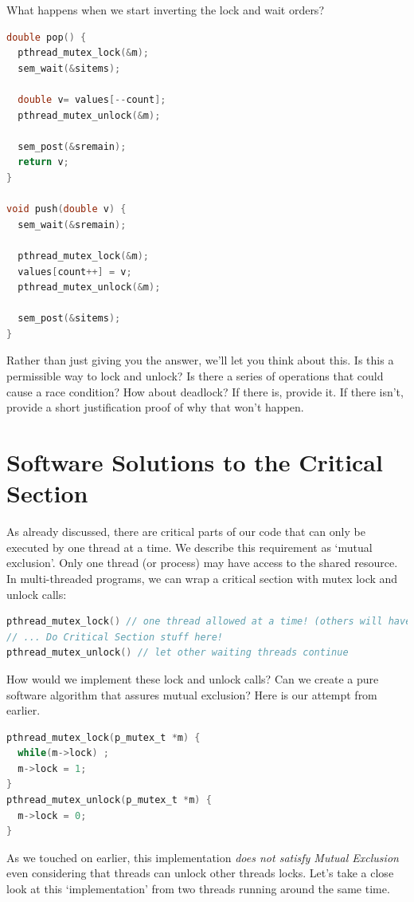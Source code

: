 What happens when we start inverting the lock and wait orders?

\begin{lstlisting}[language=C]
double pop() {
  pthread_mutex_lock(&m);
  sem_wait(&sitems);

  double v= values[--count];
  pthread_mutex_unlock(&m);

  sem_post(&sremain);
  return v;
}

void push(double v) {
  sem_wait(&sremain);

  pthread_mutex_lock(&m);
  values[count++] = v;
  pthread_mutex_unlock(&m);

  sem_post(&sitems);
}
\end{lstlisting}

Rather than just giving you the answer, we'll let you think about this.
Is this a permissible way to lock and unlock?
Is there a series of operations that could cause a race condition?
How about deadlock?
If there is, provide it.
If there isn't, provide a short justification proof of why that won't happen.

\section{Software Solutions to the Critical Section}

As already discussed, there are critical parts of our code that can only be executed by one thread at a time.
We describe this requirement as `mutual exclusion'.
Only one thread (or process) may have access to the shared resource.
In multi-threaded programs, we can wrap a critical section with mutex lock and unlock calls:

\begin{lstlisting}[language=C]
pthread_mutex_lock() // one thread allowed at a time! (others will have to wait here)
// ... Do Critical Section stuff here!
pthread_mutex_unlock() // let other waiting threads continue
\end{lstlisting}

How would we implement these lock and unlock calls?
Can we create a pure software algorithm that assures mutual exclusion?
Here is our attempt from earlier.

\begin{lstlisting}[language=C]
pthread_mutex_lock(p_mutex_t *m) {
  while(m->lock) ;
  m->lock = 1;
}
pthread_mutex_unlock(p_mutex_t *m) {
  m->lock = 0;
}
\end{lstlisting}

As we touched on earlier, this implementation \emph{does not satisfy Mutual Exclusion} even considering that threads can unlock other threads locks.
Let's take a close look at this `implementation' from two threads running around the same time.


